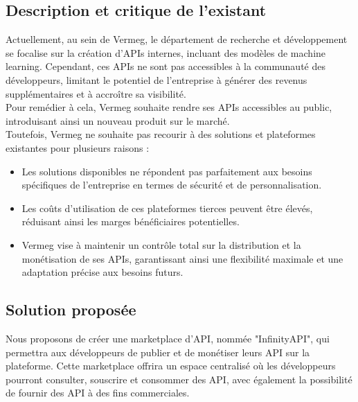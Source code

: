 \subsection{Description et critique de l'existant }
Actuellement, au sein de Vermeg, le département de recherche et développement se focalise sur la création d’APIs internes, incluant des modèles de machine learning. Cependant, ces APIs ne sont pas accessibles à la communauté des développeurs, limitant le potentiel de l’entreprise à générer des revenus supplémentaires et à accroître sa visibilité. \\
Pour remédier à cela, Vermeg souhaite rendre ses APIs accessibles au public, introduisant ainsi un nouveau produit sur le marché. \\
Toutefois, Vermeg ne souhaite pas recourir à des solutions et plateformes existantes pour plusieurs raisons : 
\begin{itemize}
    \item Les solutions disponibles ne répondent pas parfaitement aux besoins spécifiques de l’entreprise en termes de sécurité et de personnalisation. 
    \item Les coûts d’utilisation de ces plateformes tierces peuvent être élevés, réduisant ainsi les marges bénéficiaires potentielles.
    \item Vermeg vise à maintenir un contrôle total sur la distribution et la monétisation de ses APIs, garantissant ainsi une flexibilité maximale et une adaptation précise aux besoins futurs. 
\end{itemize}

\subsection{Solution proposée}

Nous proposons de créer une marketplace d'API, nommée "InfinityAPI", qui permettra aux développeurs de publier et de monétiser leurs API sur la plateforme. Cette marketplace offrira un espace centralisé où les développeurs pourront consulter, souscrire et consommer des API, avec également la possibilité de fournir des API à des fins commerciales.

